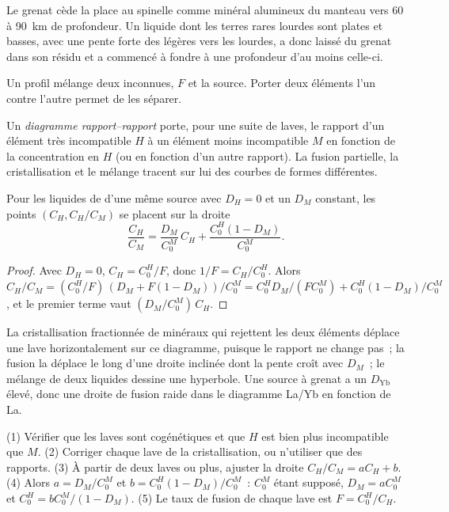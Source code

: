 Le grenat cède la place au spinelle comme minéral alumineux du manteau vers 60
à \qty{90}{km} de profondeur. Un liquide dont les terres rares lourdes sont plates et basses,
avec une pente forte des légères vers les lourdes, a donc laissé du grenat dans son résidu et
a commencé à fondre à une profondeur d'au moins celle-ci.

Un profil mélange deux inconnues, $F$ et la source. Porter deux éléments
l'un contre l'autre permet de les séparer.

\begin{definition}\label{def:b3:trace-element-modelling:ratios}
Un \emph{diagramme rapport--rapport} porte, pour une suite
de laves, le rapport d'un élément très incompatible $H$ à un élément moins
incompatible $M$ en fonction de la concentration en $H$ (ou en fonction d'un autre
rapport). La fusion partielle, la cristallisation et le mélange tracent sur lui des courbes
de formes différentes.
\end{definition}

\begin{proposition}\label{prop:b3:trace-element-modelling:line}
Pour les liquides de  d'une même source avec $D_H = 0$ et un $D_M$ constant, les points
$(C_H, C_H/C_M)$ se placent sur la droite
\[
\frac{C_H}{C_M} = \frac{D_M}{C_0^M}\,C_H + \frac{C_0^H(1 - D_M)}{C_0^M}.
\]
\end{proposition}

\begin{proof}
Avec $D_H = 0$, $C_H = C_0^H/F$, donc $1/F = C_H/C_0^H$. Alors
$C_H/C_M = (C_0^H/F)\,(D_M + F(1 - D_M))/C_0^M = C_0^HD_M/(FC_0^M) +
C_0^H(1 - D_M)/C_0^M$, et le premier terme vaut $(D_M/C_0^M)\,C_H$.
\end{proof}

La cristallisation fractionnée de minéraux qui rejettent les deux éléments déplace une lave
horizontalement sur ce diagramme, puisque le rapport ne change pas~; la fusion la déplace
le long d'une droite inclinée dont la pente croît avec $D_M$~; le mélange de deux liquides dessine une
hyperbole. Une source à grenat a un $D_{\mathrm{Yb}}$ élevé, donc une droite de fusion
raide dans le diagramme La/Yb en fonction de La.

\begin{method}\label{met:b3:trace-element-modelling:invert}
(1) Vérifier que les laves sont cogénétiques et que $H$ est bien plus incompatible
que $M$. (2) Corriger chaque lave de la cristallisation, ou n'utiliser que des rapports.
(3) À partir de deux laves ou plus, ajuster la droite $C_H/C_M = aC_H + b$.
(4) Alors $a = D_M/C_0^M$ et $b = C_0^H(1 - D_M)/C_0^M$~: $C_0^M$ étant supposé, $D_M =
aC_0^M$ et $C_0^H = bC_0^M/(1 - D_M)$. (5) Le taux de fusion de chaque lave est
$F = C_0^H/C_H$.
\end{method}

